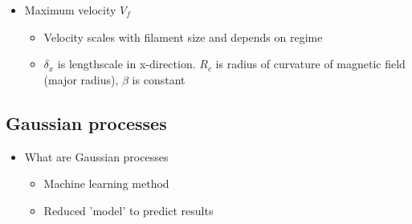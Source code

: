 \documentclass{article}
\begin{document}
\begin{itemize}
\begin{itemize}
        \item Maximum velocity $V_f$
        \begin{itemize}
            \item Velocity scales with filament size and depends on regime
            \item $\delta_x$ is lengthscale in x-direction. $R_c$ is radius of curvature of magnetic field (major radius), $\beta$ is constant
        \end{itemize}
    \end{itemize}
\end{itemize}

\subsection*{Gaussian processes} 
\begin{itemize}
    \item What are Gaussian processes \cite{hornsby_gaussian_2024}
    \begin{itemize}    
        \item Machine learning method
        \item Reduced 'model' to predict results
    \end{itemize}
\end{itemize}

\nocite{*}
\printbibliography[title={References}]
\end{document}
